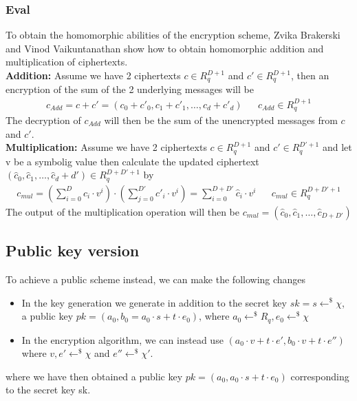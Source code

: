 \documentclass[../main.tex]{subfiles}
\begin{document}
\subsubsection{Eval}
To obtain the homomorphic abilities of the encryption scheme, Zvika Brakerski and Vinod Vaikuntanathan show
how to obtain homomorphic addition and multiplication of ciphertexts.
\\[2mm]
\textbf{Addition:} Assume we have 2 ciphertexts $c \in R_q^{D+1}$ and $c' \in R_q^{D+1}$, then an encryption
of the sum of the 2 underlying messages will be
\begin{align*}
    c_{Add} = c + c' = (c_0 + c'_0, c_1 + c'_1, \dots , c_d + c'_d) &  & c_{Add} \in R_q^{D + 1}
\end{align*}
The decryption of $c_{Add}$ will then be the sum of the unencrypted messages from $c$ and $c'$.
\\[2mm]
\textbf{Multiplication:} Assume we have 2 ciphertexts $c \in R_q^{D+1}$ and $c' \in R_q^{D'+1}$ and let v be a symbolig value
then calculate the updated ciphertext
\\
$(\hat{c}_0, \hat{c}_1, \dots, \hat{c}_d+d') \in R_q^{D + D' + 1}$ by
\begin{align*}
    c_{mul} = (\sum_{i=0}^D c_i \cdot v^i) \cdot
    (\sum_{j=0}^{D'} c'_i \cdot v^i) =
    \sum_{i=0}^{D+D'} \hat{c}_i \cdot v^i
     &  & c_{mul} \in R_q^{D+D'+1}
\end{align*}
The output of the multiplication operation will then be $c_{mul} = (\hat{c}_0, \hat{c}_1, \dots, \hat{c}_{D+D'})$

\subsection{Public key version}
To achieve a public scheme instead, we can make the following changes
\begin{itemize}
    \item In the key generation we generate in addition to the secret key $sk = s \leftarrow^{\$} \chi$, a public key
        $pk = (a_0 , b_0 = a_0 \cdot s + t \cdot e_0)$, where $a_0 \leftarrow^{\$} R_q, e_0 \leftarrow^{\$} \chi$
    \item In the encryption algorithm, we can instead use
        $(a_0 \cdot v + t \cdot e', b_0 \cdot v + t \cdot e'')$ where
        $v, e' \leftarrow^{\$} \chi$ and $e'' \leftarrow^{\$} \chi '$.
\end{itemize} 
where we have then obtained a public key $pk = (a_0, a_0 \cdot s + t \cdot e_0)$
corresponding to the secret key sk.
\end{document}
